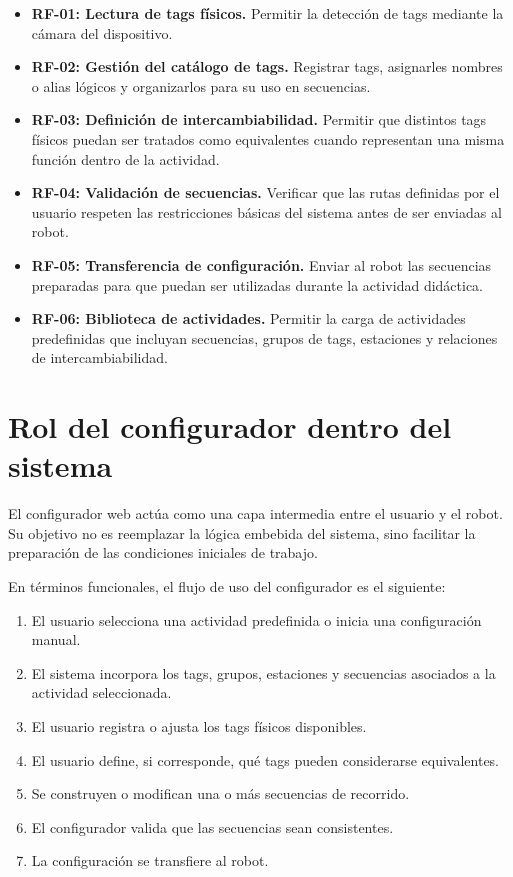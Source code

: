\documentclass{prgrado}
\begin{document}
\begin{itemize}
    \item \textbf{RF-01: Lectura de tags físicos.} Permitir la detección de tags mediante la cámara del dispositivo.
    
    \item \textbf{RF-02: Gestión del catálogo de tags.} Registrar tags, asignarles nombres o alias lógicos y organizarlos para su uso en secuencias.
    
    \item \textbf{RF-03: Definición de intercambiabilidad.} Permitir que distintos tags físicos puedan ser tratados como equivalentes cuando representan una misma función dentro de la actividad.
    
    \item \textbf{RF-04: Validación de secuencias.} Verificar que las rutas definidas por el usuario respeten las restricciones básicas del sistema antes de ser enviadas al robot.
    
    \item \textbf{RF-05: Transferencia de configuración.} Enviar al robot las secuencias preparadas para que puedan ser utilizadas durante la actividad didáctica.

    \item \textbf{RF-06: Biblioteca de actividades.} Permitir la carga de actividades predefinidas que incluyan secuencias, grupos de tags, estaciones y relaciones de intercambiabilidad.
\end{itemize}

\section{Rol del configurador dentro del sistema}

El configurador web actúa como una capa intermedia entre el usuario y el robot. Su objetivo no es reemplazar la lógica embebida del sistema, sino facilitar la preparación de las condiciones iniciales de trabajo.

En términos funcionales, el flujo de uso del configurador es el siguiente:

\begin{enumerate}
    \item El usuario selecciona una actividad predefinida o inicia una configuración manual.
    \item El sistema incorpora los tags, grupos, estaciones y secuencias asociados a la actividad seleccionada.
    \item El usuario registra o ajusta los tags físicos disponibles.
    \item El usuario define, si corresponde, qué tags pueden considerarse equivalentes.
    \item Se construyen o modifican una o más secuencias de recorrido.
    \item El configurador valida que las secuencias sean consistentes.
    \item La configuración se transfiere al robot.
\end{enumerate}
\end{document}
